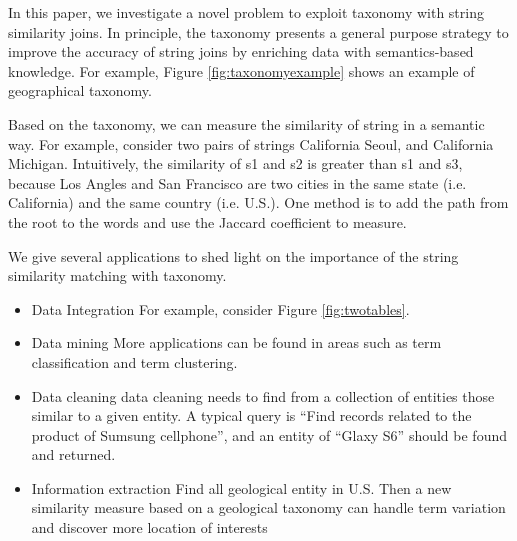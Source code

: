 In this paper, we investigate a novel problem to exploit taxonomy with string similarity joins. In principle, the taxonomy presents a general purpose strategy to improve the accuracy of string joins by enriching data with semantics-based knowledge. For example, Figure \ref{fig:taxonomyexample} shows an example of geographical taxonomy.

Based on the taxonomy, we can measure the similarity of string in a semantic way. For example, consider two pairs of strings California Seoul, and California Michigan. Intuitively, the similarity of s1 and s2 is greater than s1 and s3, because Los Angles and San Francisco are two cities in the same state (i.e. California) and the same country (i.e. U.S.). One method is to add the path from the root to the words and use the Jaccard coefficient to measure.



We give several applications to shed light on the importance of the  string similarity matching with taxonomy.

\begin{itemize}
  \item Data Integration For example, consider Figure \ref{fig:twotables}.
  \item Data mining More applications can be found in areas such as term classification and term clustering.
  \item Data cleaning data cleaning needs to find from a collection of entities those similar to a given entity. A typical query is ``Find records related to the product of Sumsung cellphone'', and an entity of ``Glaxy S6'' should be found and returned.
  \item Information extraction Find all geological entity in U.S. Then a new similarity measure based on a geological taxonomy can handle term variation and discover more location of interests
\end{itemize}







